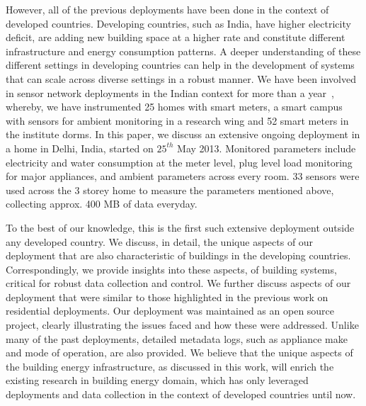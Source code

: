 \documentclass[10pt]{sensys-proc}
\newcommand{\redcolor}[1]{\textcolor{red}{#1}}
\begin{document}
 However, all of the previous deployments have been done in the context of developed countries. Developing countries, such as India, have higher electricity deficit, are adding new building space at a higher rate and constitute different infrastructure and energy consumption patterns. A deeper understanding of these different settings in developing countries can help in the development of systems that can scale across diverse settings in a robust manner. %
We have been involved in sensor network deployments in the Indian context for more than a year~\cite{batra}, whereby, we have instrumented 25 homes with smart meters, a smart campus with sensors for ambient monitoring in a research wing and 52 smart meters in the institute dorms. In this paper, we discuss an extensive ongoing deployment in a home in Delhi, India, started on $25^{th}$ May 2013. Monitored parameters include electricity and water consumption at the meter level, plug level load monitoring for major appliances, and ambient parameters across every room. 33 sensors were used across the 3 storey home to measure the parameters mentioned above, collecting approx. 400 MB of data everyday.%

 To the best of our knowledge, this is the first such extensive deployment outside any developed country. We discuss, in detail, the unique aspects of our deployment that are also characteristic of buildings in the developing countries. Correspondingly, we provide insights into these aspects, of building systems, critical for robust data collection and control. We further discuss aspects of our deployment that were similar to those highlighted in the previous work on residential deployments. Our deployment was maintained as an open source project, clearly illustrating the issues faced and how these were addressed. Unlike many of the past deployments, detailed metadata logs, such as appliance make and mode of operation, are also provided. We believe that the unique aspects of the building energy infrastructure, as discussed in this work, will enrich the existing research in building energy domain, which has only leveraged deployments and data collection in the context of developed countries until now. %
\end{document}
